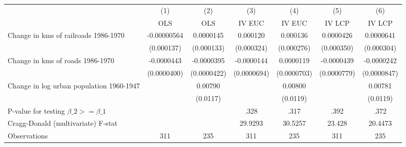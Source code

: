 {
\def\sym#1{\ifmmode^{#1}\else\(^{#1}\)\fi}
\begin{tabular}{l*{6}{c}}
\hline\hline
                &\multicolumn{1}{c}{(1)}&\multicolumn{1}{c}{(2)}&\multicolumn{1}{c}{(3)}&\multicolumn{1}{c}{(4)}&\multicolumn{1}{c}{(5)}&\multicolumn{1}{c}{(6)}\\
                &\multicolumn{1}{c}{OLS}&\multicolumn{1}{c}{OLS}&\multicolumn{1}{c}{IV EUC}&\multicolumn{1}{c}{IV EUC}&\multicolumn{1}{c}{IV LCP}&\multicolumn{1}{c}{IV LCP}\\
\hline
Change in kms of railroads 1986-1970&-0.00000564         &0.0000145         & 0.000120         & 0.000136         &0.0000426         &0.0000641         \\
                &(0.000137)         &(0.000133)         &(0.000324)         &(0.000276)         &(0.000350)         &(0.000304)         \\
[1em]
Change in kms of roads 1986-1970&-0.0000443         &-0.0000395         &-0.0000144         &0.0000119         &-0.0000439         &-0.0000242         \\
                &(0.0000400)         &(0.0000422)         &(0.0000694)         &(0.0000703)         &(0.0000779)         &(0.0000847)         \\
[1em]
Change in log urban population 1960-1947&                  &  0.00790         &                  &  0.00800         &                  &  0.00781         \\
                &                  & (0.0117)         &                  & (0.0119)         &                  & (0.0119)         \\
\hline
P-value for testing $\beta\_{2} >= \beta\_{1}$&                  &                  &     .328         &     .317         &     .392         &     .372         \\
Cragg-Donald (multivariate) F-stat&                  &                  &  29.9293         &  30.5257         &   23.428         &  20.4473         \\
Observations    &      311         &      235         &      311         &      235         &      311         &      235         \\
\hline\hline
\end{tabular}
}

